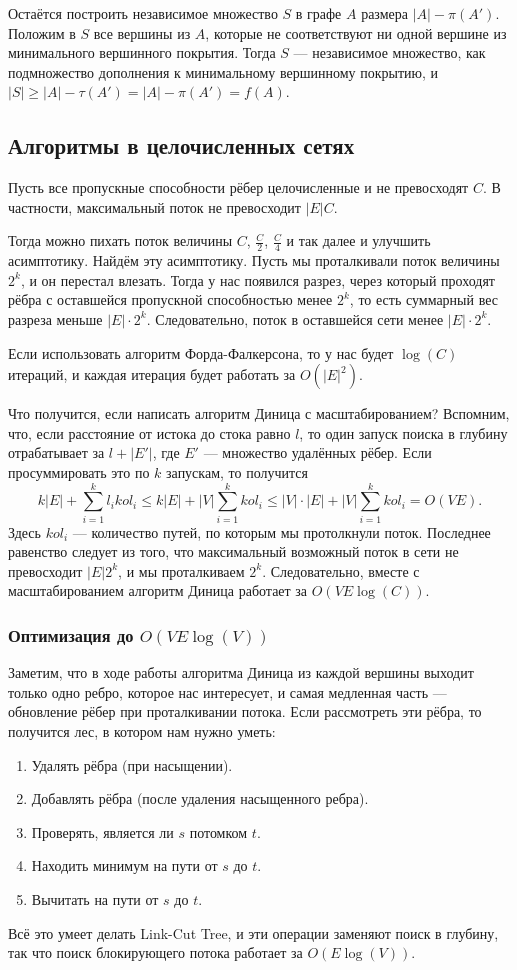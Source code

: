 Остаётся построить независимое множество $S$ в графе $A$ размера $|A| - \pi(A')$.
Положим в $S$ все вершины из $A$, которые не соответствуют ни одной вершине из минимального вершинного покрытия.
Тогда $S$ --- независимое множество, как подмножество дополнения к минимальному вершинному покрытию, и $|S| \ge |A| - \tau(A') = |A| - \pi(A') = f(A)$.

\subsection{Алгоритмы в целочисленных сетях}
Пусть все пропускные способности рёбер целочисленные и не превосходят $C$. В частности, максимальный поток не превосходит $|E|C$.

Тогда можно пихать поток величины $C$, $\frac{C}{2}$, $\frac{C}{4}$ и так далее и улучшить асимптотику.
Найдём эту асимптотику. Пусть мы проталкивали поток величины $2^k$, и он перестал влезать.
Тогда у нас появился разрез, через который проходят рёбра с оставшейся пропускной способностью менее $2^k$, то есть суммарный вес разреза меньше $|E| \cdot 2^k$.
Следовательно, поток в оставшейся сети менее $|E| \cdot 2^k$.

Если использовать алгоритм Форда-Фалкерсона, то у нас будет $\log(C)$ итераций, и каждая итерация будет работать за $O(|E|^2)$.

Что получится, если написать алгоритм Диница с масштабированием?
Вспомним, что, если расстояние от истока до стока равно $l$, то один запуск поиска в глубину отрабатывает за $l + |E'|$, где $E'$ --- множество удалённых рёбер.
Если просуммировать это по $k$ запускам, то получится
\[
    k|E| + \sum_{i=1}^{k} l_i kol_i \le k|E| + |V| \sum_{i=1}^{k} kol_i \le |V| \cdot |E| + |V| \sum_{i=1}^{k} kol_i = O(VE).
\]
Здесь $kol_i$ --- количество путей, по которым мы протолкнули поток.
Последнее равенство следует из того, что максимальный возможный поток в сети не превосходит $|E| 2^k$, и мы проталкиваем $2^k$.
Следовательно, вместе с масштабированием алгоритм Диница работает за $O(VE \log(C))$.

\subsubsection{Оптимизация до $O(VE \log(V))$}
Заметим, что в ходе работы алгоритма Диница из каждой вершины выходит только одно ребро, которое нас интересует, и самая медленная часть --- обновление рёбер при проталкивании потока.
Если рассмотреть эти рёбра, то получится лес, в котором нам нужно уметь:
\begin{enumerate}
    \item Удалять рёбра (при насыщении).
    \item Добавлять рёбра (после удаления насыщенного ребра).
    \item Проверять, является ли $s$ потомком $t$.
    \item Находить минимум на пути от $s$ до $t$.
    \item Вычитать на пути от $s$ до $t$.
\end{enumerate}
Всё это умеет делать Link-Cut Tree, и эти операции заменяют поиск в глубину, так что поиск блокирующего потока работает за $O(E \log(V))$.

